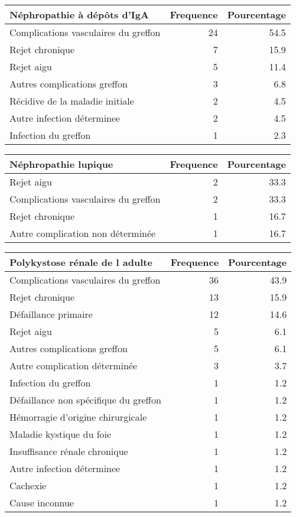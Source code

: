\documentclass[11pt,a4paper]{article}\usepackage[]{graphicx}\usepackage[]{color}
\begin{document}
\begin{table}[H]
\centering
\begin{tabular}{lrr}
  \hline
Néphropathie à dépôts d'IgA & Frequence & Pourcentage \\ 
  \hline
Complications vasculaires du greffon & 24 & 54.5 \\ 
  Rejet chronique & 7 & 15.9 \\ 
  Rejet aigu & 5 & 11.4 \\ 
  Autres complications greffon & 3 & 6.8 \\ 
  Récidive de la maladie initiale & 2 & 4.5 \\ 
  Autre infection déterminee & 2 & 4.5 \\ 
  Infection du greffon & 1 & 2.3 \\ 
   \hline
\end{tabular}
\end{table}
\begin{table}[H]
\centering
\begin{tabular}{lrr}
  \hline
Néphropathie lupique & Frequence & Pourcentage \\ 
  \hline
Rejet aigu & 2 & 33.3 \\ 
  Complications vasculaires du greffon & 2 & 33.3 \\ 
  Rejet chronique & 1 & 16.7 \\ 
  Autre complication non déterminée & 1 & 16.7 \\ 
   \hline
\end{tabular}
\end{table}
\begin{table}[H]
\centering
\begin{tabular}{lrr}
  \hline
Polykystose rénale de l adulte & Frequence & Pourcentage \\ 
  \hline
Complications vasculaires du greffon & 36 & 43.9 \\ 
  Rejet chronique & 13 & 15.9 \\ 
  Défaillance primaire & 12 & 14.6 \\ 
  Rejet aigu & 5 & 6.1 \\ 
  Autres complications greffon & 5 & 6.1 \\ 
  Autre complication déterminée & 3 & 3.7 \\ 
  Infection du greffon & 1 & 1.2 \\ 
  Défaillance non spécifique du greffon & 1 & 1.2 \\ 
  Hémorragie d'origine chirurgicale & 1 & 1.2 \\ 
  Maladie kystique du foie & 1 & 1.2 \\ 
  Insuffisance rénale chronique & 1 & 1.2 \\ 
  Autre infection déterminee & 1 & 1.2 \\ 
  Cachexie & 1 & 1.2 \\ 
  Cause inconnue & 1 & 1.2 \\ 
   \hline
\end{tabular}
\end{table}
\end{document}

